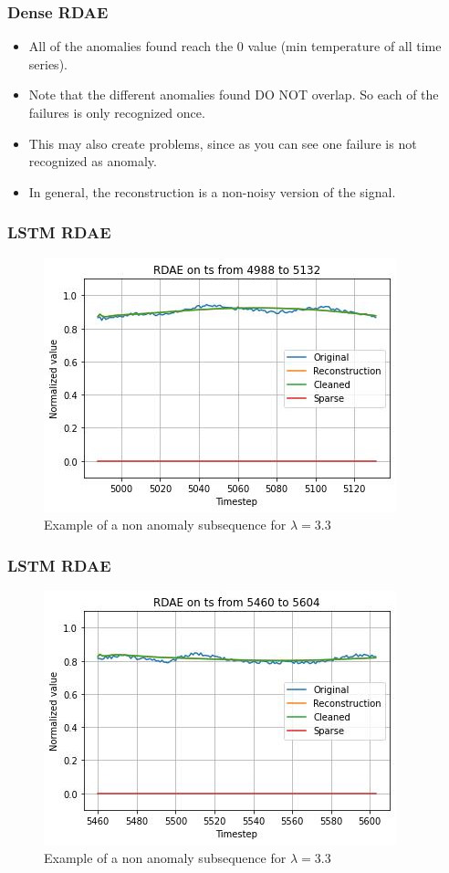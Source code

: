 \documentclass{beamer}
\theoremstyle{plain}
\theoremstyle{definition}
\theoremstyle{remark}
\begin{document}
\begin{frame}
	\frametitle{Dense RDAE}
	\begin{itemize}
		\item All of the anomalies found reach the $0$ value (min temperature of all time series).
		\item Note that the different anomalies found DO NOT overlap. So each of the failures is only recognized once.
		\item This may also create problems, since as you can see one failure is not recognized as anomaly.
		\item In general, the reconstruction is a non-noisy version of the signal.
	\end{itemize}
\end{frame}

\begin{frame}
	\frametitle{LSTM RDAE}
	\begin{figure}
		\centering
		\includegraphics[width=0.7\linewidth]{Images/LSTMlam3.3ts_non_anomaly4988.jpg}
		\caption[]{Example of a non anomaly subsequence for $\lambda=3.3$}
	\end{figure}
\end{frame}

\begin{frame}
	\frametitle{LSTM RDAE}
	\begin{figure}
		\centering
		\includegraphics[width=0.7\linewidth]{Images/LSTMlam3.3ts_non_anomaly5460.jpg}
		\caption[]{Example of a non anomaly subsequence for $\lambda=3.3$}
	\end{figure}
\end{frame}
\end{document}
